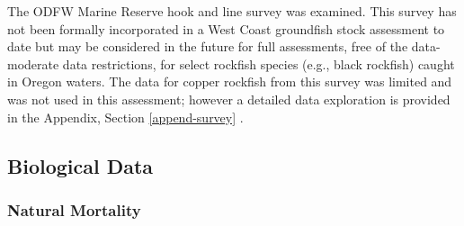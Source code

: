 \documentclass[11pt,
  english,
  a4paper,
]{article}
\begin{document}
\leavevmode\tagmcend\tagstructend


The ODFW Marine Reserve hook and line survey was examined. This survey has not been formally incorporated in a West Coast groundfish stock assessment to date but may be considered in the future for full assessments, free of the data-moderate data restrictions, for select rockfish species (e.g., black rockfish) caught in Oregon waters. The data for copper rockfish from this survey was limited and was not used in this assessment; however a detailed data exploration is provided in the Appendix, Section \ref{append-survey} .

\leavevmode\tagmcend\tagstructend\par


\hypertarget{biological-data}{%
\subsection{Biological Data}\label{biological-data}}

\leavevmode\tagmcend\tagstructend


\hypertarget{natural-mortality}{%
\subsubsection{Natural Mortality}\label{natural-mortality}}

\leavevmode\tagmcend\tagstructend

\end{document}
